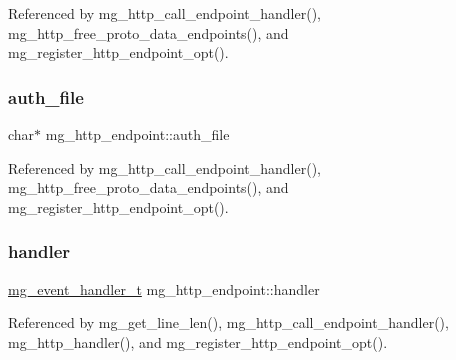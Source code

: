 Referenced by mg\+\_\+http\+\_\+call\+\_\+endpoint\+\_\+handler(), mg\+\_\+http\+\_\+free\+\_\+proto\+\_\+data\+\_\+endpoints(), and mg\+\_\+register\+\_\+http\+\_\+endpoint\+\_\+opt().

\mbox{\label{structmg__http__endpoint_ac54f73eec84df2b4caeb729e9a8fb56e_ac54f73eec84df2b4caeb729e9a8fb56e}} 
\subsubsection{\texorpdfstring{auth\+\_\+file}{auth\_file}}
{\footnotesize\ttfamily char$\ast$ mg\+\_\+http\+\_\+endpoint\+::auth\+\_\+file}



Referenced by mg\+\_\+http\+\_\+call\+\_\+endpoint\+\_\+handler(), mg\+\_\+http\+\_\+free\+\_\+proto\+\_\+data\+\_\+endpoints(), and mg\+\_\+register\+\_\+http\+\_\+endpoint\+\_\+opt().

\mbox{\label{structmg__http__endpoint_a24176c5ff8bb9ffb89a8f553e8e066e0_a24176c5ff8bb9ffb89a8f553e8e066e0}} 
\subsubsection{\texorpdfstring{handler}{handler}}
{\footnotesize\ttfamily \hyperlink{mongoose_8h_ae5a76da37b3496fcdf561e51648eabda_ae5a76da37b3496fcdf561e51648eabda}{mg\+\_\+event\+\_\+handler\+\_\+t} mg\+\_\+http\+\_\+endpoint\+::handler}



Referenced by mg\+\_\+get\+\_\+line\+\_\+len(), mg\+\_\+http\+\_\+call\+\_\+endpoint\+\_\+handler(), mg\+\_\+http\+\_\+handler(), and mg\+\_\+register\+\_\+http\+\_\+endpoint\+\_\+opt().

\mbox{\label{structmg__http__endpoint_a28fd60f7d7ade3f17130287713340ab7_a28fd60f7d7ade3f17130287713340ab7}} 
